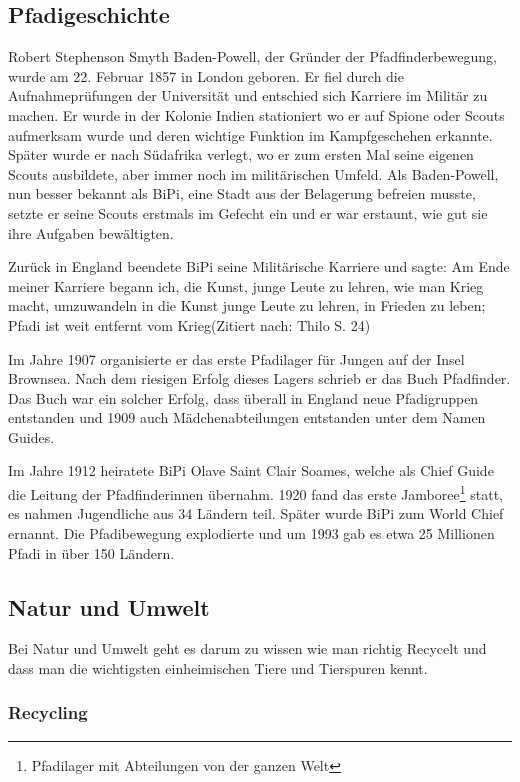 \subsection*{Pfadigeschichte}
Robert Stephenson Smyth Baden-Powell, der Gründer der Pfadfinderbewegung, wurde am 22. Februar 1857 in London geboren. Er fiel durch die Aufnahmeprüfungen der Universität und entschied sich Karriere im Militär zu machen. Er wurde in der Kolonie Indien stationiert wo er auf Spione oder Scouts aufmerksam wurde und deren wichtige Funktion im Kampfgeschehen erkannte. Später wurde er nach Südafrika verlegt, wo er zum ersten Mal seine eigenen Scouts ausbildete, aber immer noch im militärischen Umfeld. Als Baden-Powell, nun besser bekannt als BiPi, eine Stadt aus der Belagerung befreien musste, setzte er seine Scouts erstmals im Gefecht ein und er war erstaunt, wie gut sie ihre Aufgaben bewältigten. \par Zurück in England beendete BiPi seine Militärische Karriere und sagte: \glqq Am Ende meiner Karriere begann ich, die Kunst, junge Leute zu lehren, wie man Krieg macht, umzuwandeln in die Kunst junge Leute zu lehren, in Frieden zu leben; Pfadi ist weit entfernt vom Krieg\grqq\cite{noauthor_thilo_2014}(Zitiert nach: Thilo S. 24) \par
Im Jahre 1907 organisierte er das erste Pfadilager für Jungen auf der Insel Brownsea. Nach dem riesigen Erfolg dieses Lagers schrieb er das Buch Pfadfinder. Das Buch war ein solcher Erfolg, dass überall in England neue Pfadigruppen entstanden und 1909 auch Mädchenabteilungen entstanden unter dem Namen Guides. \par Im Jahre 1912 heiratete BiPi Olave Saint Clair Soames, welche als Chief Guide die Leitung der Pfadfinderinnen übernahm. 1920 fand das erste Jamboree\footnote{Pfadilager mit Abteilungen von der ganzen Welt} statt, es nahmen Jugendliche aus 34 Ländern teil. Später wurde BiPi zum World Chief ernannt. Die Pfadibewegung explodierte und um 1993 gab es etwa 25 Millionen Pfadi in über 150 Ländern.

\subsection*{Natur und Umwelt}

Bei Natur und Umwelt geht es darum zu wissen wie man richtig Recycelt und dass man die wichtigsten einheimischen Tiere und Tierspuren kennt.

\subsubsection{Recycling}


